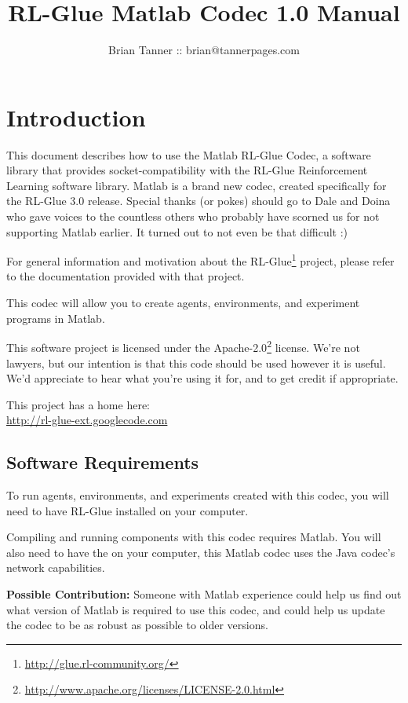 \documentclass[11pt]{article}
\title{RL-Glue Matlab Codec 1.0 Manual }
\author{Brian Tanner :: brian@tannerpages.com}
\date{}
\begin{document}
\maketitle
\tableofcontents

\section{Introduction}

This document describes how to use the Matlab RL-Glue Codec, a software library that provides socket-compatibility with the RL-Glue Reinforcement Learning software library.  Matlab is a brand new codec, created specifically for the RL-Glue 3.0 release.  Special thanks (or pokes) should go to Dale and Doina who gave voices to the countless others who probably
have scorned us for not supporting Matlab earlier.  It turned out to not even be that difficult :)

For general information and motivation about the RL-Glue\footnote{\url{http://glue.rl-community.org/}} project, please refer to the documentation provided with that project.

This codec will allow you to create agents, environments, and experiment programs in Matlab.

This software project is licensed under the Apache-2.0\footnote{\url{http://www.apache.org/licenses/LICENSE-2.0.html}} license. We're not lawyers, but our intention is that this code 
should be used however it is useful.  We'd appreciate to hear what you're using it for, and to get credit if appropriate.

This project has a home here:\\
\url{http://rl-glue-ext.googlecode.com}


\subsection{Software Requirements}
To run agents, environments, and experiments created with this codec, you will need to have RL-Glue installed on your computer.

Compiling and running components with this codec requires Matlab.  You will also need to have the  on your computer, this Matlab codec uses
the Java codec's network capabilities.

\textbf{Possible Contribution: }Someone with Matlab experience could help us find out what version of Matlab is required to use this codec, and could help us update the codec
to be as robust as possible to older versions.
\end{document}
